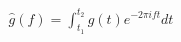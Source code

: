 \documentclass[preview]{standalone}
\begin{document}
\begin{align*}
\hat g( f ) = \int _{t_1} ^{t_{2}} g( t ) e ^{-2\pi i f t} dt
\end{align*}
\end{document}
